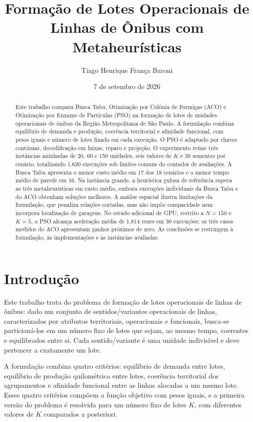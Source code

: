 \documentclass[12pt,a4paper]{article}
\title{Formação de Lotes Operacionais de Linhas de Ônibus com Metaheurísticas}
\author{Tiago Henrique França Baroni}
\date{7 de setembro de 2026}
\begin{document}
\maketitle

\begin{abstract}
\small
Este trabalho compara Busca Tabu, Otimização por Colônia de Formigas (ACO) e Otimização
por Enxame de Partículas (PSO) na formação de lotes de unidades operacionais de ônibus
da Região Metropolitana de São Paulo. A formulação combina equilíbrio de demanda e
produção, coerência territorial e afinidade funcional, com pesos iguais e número de
lotes fixado em cada execução. O PSO é adaptado por chaves contínuas, decodificação em
faixas, reparo e projeção. O experimento reúne três instâncias aninhadas de 20, 60 e 150
unidades, seis valores de $K$ e 30 sementes por cenário, totalizando 1.620 execuções sob
limites comuns do contador de avaliações. A Busca Tabu apresenta o menor custo médio em
17 dos 18 cenários e o menor tempo médio de parede em 16. Na instância grande, a
heurística gulosa de referência supera as três metaheurísticas em custo médio, embora
execuções individuais da Busca Tabu e do ACO obtenham soluções melhores. A análise
espacial ilustra limitações da formulação, que penaliza relações cortadas, mas não impõe
compacidade nem incorpora localização de garagens. No estudo adicional de GPU, restrito
a $N=150$ e $K=5$, o PSO alcança aceleração média de 1,814 vezes em 30 execuções; os
três casos medidos do ACO apresentam ganhos próximos de zero. As conclusões se
restringem à formulação, às implementações e às instâncias avaliadas.

\end{abstract}

\tableofcontents
\newpage

\section{Introdução}
\label{sec:introducao}

Este trabalho trata do problema de formação de lotes operacionais de linhas
de ônibus: dado um conjunto de sentidos/variantes operacionais de linhas,
caracterizados por atributos territoriais, operacionais e funcionais, busca-se
particioná-los em um número fixo de lotes que sejam, ao mesmo tempo,
coerentes e equilibrados entre si. Cada sentido/variante é uma unidade
indivisível e deve pertencer a exatamente um lote.

A formulação combina quatro critérios:
equilíbrio de demanda entre lotes, equilíbrio de produção quilométrica entre
lotes, coerência territorial dos agrupamentos e afinidade funcional entre as
linhas alocadas a um mesmo lote. Esses quatro critérios compõem a função
objetivo com pesos iguais, e a primeira versão do problema é resolvida para
um número fixo de lotes \(K\), com diferentes valores de \(K\) comparados a
posteriori.
\end{document}
